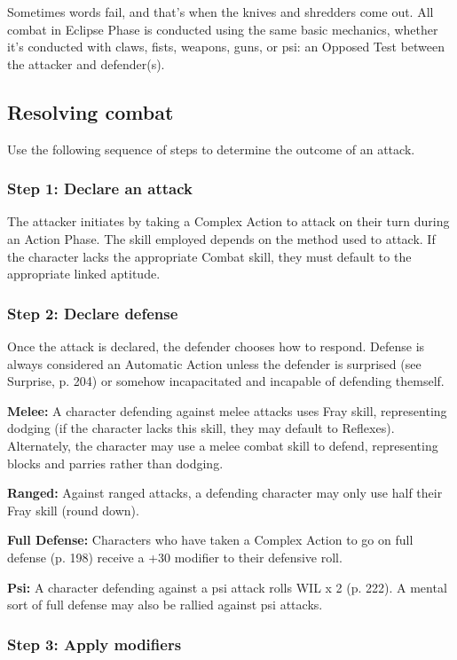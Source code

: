 Sometimes words fail, and that’s when the knives and shredders come out. All combat in Eclipse Phase is conducted using the same basic mechanics, whether it’s conducted with claws, fists, weapons, guns, or psi: an Opposed Test between the attacker and defender(s).

\subsection{Resolving combat}

Use the following sequence of steps to determine the outcome of an attack.

\subsubsection{Step 1: Declare an attack}

The attacker initiates by taking a Complex Action to attack on their turn during an Action Phase. The skill employed depends on the method used to attack. If the character lacks the appropriate Combat skill, they must default to the appropriate linked aptitude.

\subsubsection{Step 2: Declare defense}

Once the attack is declared, the defender chooses how to respond. Defense is always considered an Automatic Action unless the defender is surprised (see Surprise, p. 204) or somehow incapacitated and incapable of defending themself.

\textbf{Melee:} A character defending against melee attacks uses Fray skill, representing dodging (if the character lacks this skill, they may default to Reflexes). Alternately, the character may use a melee combat skill to defend, representing blocks and parries rather than dodging.

\textbf{Ranged:} Against ranged attacks, a defending character may only use half their Fray skill (round down).

\textbf{Full Defense:} Characters who have taken a Complex Action to go on full defense (p. 198) receive a +30 modifier to their defensive roll.

\textbf{Psi:} A character defending against a psi attack rolls WIL x 2 (p. 222). A mental sort of full defense may also be rallied against psi attacks.

\subsubsection{Step 3: Apply modifiers}

